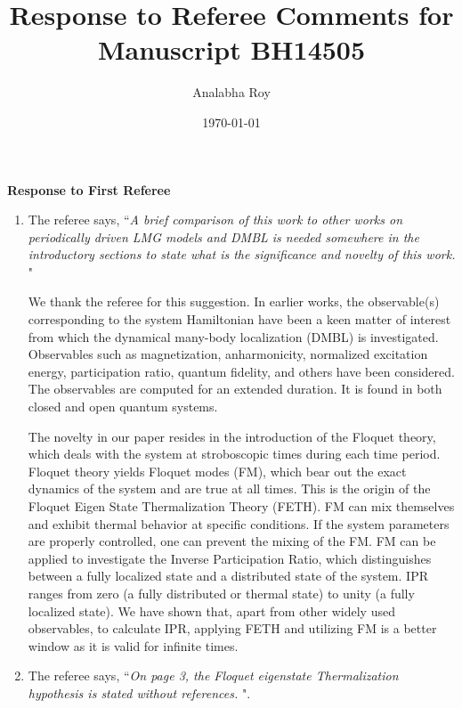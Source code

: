 \documentclass[aps,prb,reprint,showpacs,floatfix,superscriptaddress, onecolumn, nofootinbib, 9pt]{revtex4-2}
\newcommand{\response}[1]{{\color{blue}#1}} %
\begin{document}

\title{Response to Referee Comments for Manuscript BH14505}
\author{Analabha Roy}
\date{\today}

\maketitle

\vspace{1em}

\noindent \textbf{Response to First Referee}

\begin{enumerate}
\item The referee says, ``\textit{A brief comparison of this work to other works on periodically driven LMG models and DMBL is needed somewhere in the introductory sections to state what is the significance and novelty of this work. }"\\

\response{
We thank the referee for this suggestion. In earlier works, the observable(s) corresponding to the system Hamiltonian have been a keen matter of interest from which the dynamical many-body localization (DMBL) is investigated. Observables such as magnetization, anharmonicity, normalized excitation energy, participation ratio, quantum fidelity, and others have been considered. The observables are computed for an extended duration. It is found in both closed and open quantum systems.

The novelty in our paper resides in the introduction of the Floquet theory, which deals with the system at stroboscopic times during each time period. Floquet theory yields Floquet modes (FM), which bear out the exact dynamics of the system and are true at all times. This is the origin of the Floquet Eigen State Thermalization Theory (FETH). FM can mix themselves and exhibit thermal behavior at specific conditions. If the system parameters are properly controlled, one can prevent the mixing of the FM. FM can be applied to investigate the Inverse Participation Ratio, which distinguishes between a fully localized state and a distributed state of the system. IPR ranges from zero (a fully distributed or thermal state) to unity (a fully localized state). We have shown that, apart from other widely used observables, to calculate IPR, applying FETH and utilizing FM is a better window as it is valid for infinite times.
}
\item The referee says, ``\textit{On page 3, the Floquet eigenstate Thermalization hypothesis is stated without references. }".\\


\end{enumerate}
\end{document}
